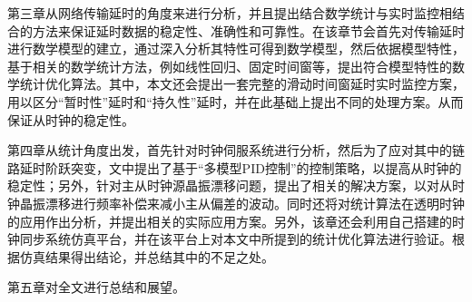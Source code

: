 第三章从网络传输延时的角度来进行分析，并且提出结合数学统计与实时监控相结合的方法来保证延时数据的稳定性、准确性和可靠性。在该章节会首先对传输延时进行数学模型的建立，通过深入分析其特性可得到数学模型，然后依据模型特性，基于相关的数学统计方法，例如线性回归、固定时间窗等，提出符合模型特性的数学统计优化算法。其中，本文还会提出一套完整的滑动时间窗延时实时监控方案，用以区分“暂时性”延时和“持久性”延时，并在此基础上提出不同的处理方案。从而保证从时钟的稳定性。

第四章从统计角度出发，首先针对时钟伺服系统进行分析，然后为了应对其中的链路延时阶跃突变，文中提出了基于“多模型PID控制”的控制策略，以提高从时钟的稳定性；另外，针对主从时钟源晶振漂移问题，提出了相关的解决方案，以对从时钟晶振漂移进行频率补偿来减小主从偏差的波动。同时还将对统计算法在透明时钟的应用作出分析，并提出相关的实际应用方案。另外，该章还会利用自己搭建的时钟同步系统仿真平台，并在该平台上对本文中所提到的统计优化算法进行验证。根据仿真结果得出结论，并总结其中的不足之处。

第五章对全文进行总结和展望。
